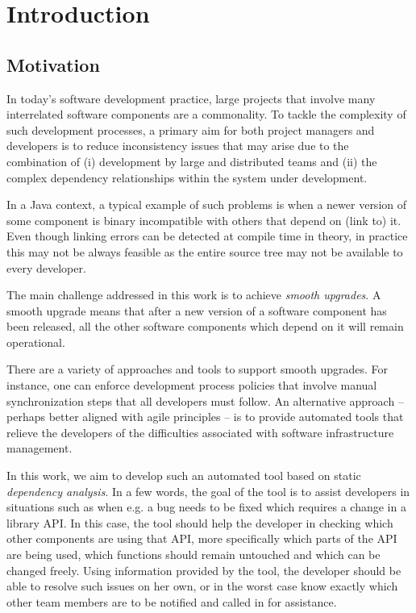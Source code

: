 \chapter{Introduction}

\section{Motivation}

In today's software development practice, large projects that involve many
interrelated software components are a commonality. To tackle the complexity of
such development processes, a primary aim for both project managers and
developers is to reduce inconsistency issues that may arise due to the
combination of (i) development by large and distributed teams and (ii) the
complex dependency relationships within the system under development.

In a Java context, a typical example of such problems is when a newer
version of some component is binary incompatible with others that depend on
(link to) it. Even though linking errors can be detected at compile time in
theory, in practice this may not be always feasible as the entire source tree
may not be available to every developer.

The main challenge addressed in this work is to achieve \emph{smooth upgrades}.
A smooth upgrade means that after a new version of a software component has been
released, all the other software components which depend on it will remain
operational.

There are a variety of approaches and tools to support smooth upgrades. For
instance, one can enforce development process policies that involve manual
synchronization steps that all developers must follow. An alternative approach
-- perhaps better aligned with agile principles -- is to provide automated tools that
relieve the developers of the difficulties associated with software
infrastructure management.

In this work, we aim to develop such an automated tool based on static
\emph{dependency analysis}. In a few words, the goal of the tool is to assist
developers in situations such as when e.g. a bug needs to be fixed which
requires a change in a library API.
In this case, the tool should help the developer in checking which other
components are using that API, more specifically which parts of the API are
being used, which functions should remain untouched and which can be changed
freely. Using information provided by the tool, the developer should be able to
resolve such issues on her own, or in the worst case know exactly which other
team members are to be notified and called in for assistance.
 
